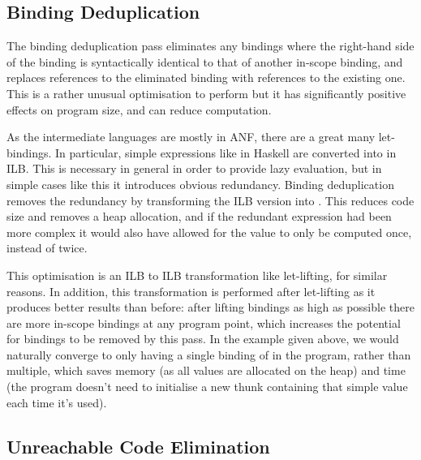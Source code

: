 \documentclass[dissertation.tex]{subfiles}
\begin{document}
{{    }
    \subsection{Binding Deduplication}\label{sec:binding-dedupe}
    {

        The binding deduplication pass eliminates any bindings where the right-hand side of the binding is
        syntactically identical to that of another in-scope binding, and replaces references to the eliminated
        binding with references to the existing one. This is a rather unusual optimisation to perform but it has
        significantly positive effects on program size, and can reduce computation.

        As the intermediate languages are mostly in ANF, there are a great many let-bindings. In particular, simple
        expressions like  in Haskell are converted into  in ILB. This is necessary in general in order to provide lazy evaluation, but in simple
        cases like this it introduces obvious redundancy. Binding deduplication removes the redundancy by
        transforming the ILB version into . This reduces code size and removes
        a heap allocation, and if the redundant expression had been more complex it would also have allowed for the
        value to only be computed once, instead of twice.

        This optimisation is an ILB to ILB transformation like let-lifting, for similar reasons. In addition, this
        transformation is performed after let-lifting as it produces better results than before: after lifting
        bindings as high as possible there are more in-scope bindings at any program point, which increases the
        potential for bindings to be removed by this pass. In the  example given above, we
        would naturally converge to only having a single binding of  in the program, rather than
        multiple, which saves memory (as all values are allocated on the heap) and time (the program doesn't need to
        initialise a new thunk containing that simple value each time it's used).


    }
    \subsection{Unreachable Code Elimination}\label{sec:unreachable-elim}
    {

}}
\end{document}
